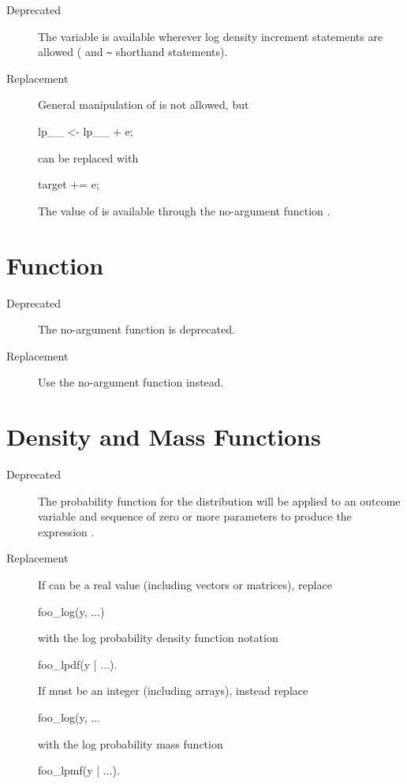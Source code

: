 \begin{description}
\item[Deprecated]
The variable  is available wherever log density increment
statements are allowed ( and \Verb|~| shorthand
statements).
\item[Replacement]
General manipulation of  is not allowed, but
\begin{stancode}
lp__ <- lp__ + e;
\end{stancode}
%
can be replaced with
%
\begin{stancode}
target += e;
\end{stancode}
%
The value of  is available through the no-argument
function .
\end{description}

\section{ Function}

\begin{description}
\item[Deprecated]
The no-argument function  is deprecated.
\item[Replacement]
Use the no-argument function  instead.
\end{description}

\section{ Density and Mass Functions}

\begin{description}
\item[Deprecated] The probability function for the distribution
   will be applied to an outcome variable  and
  sequence of zero or more parameters  to produce the
  expression .
\item[Replacement] If  can be a real value (including vectors
or matrices), replace
%
\begin{stancode}
foo_log(y, ...)
\end{stancode}
%
with the log probability density function notation
%
\begin{stancode}
foo_lpdf(y | ...).
\end{stancode}
%
If  must be an integer (including arrays),
instead replace
%
\begin{stancode}
foo_log(y, ...
\end{stancode}
%
with the log probability mass function
%
\begin{stancode}
foo_lpmf(y | ...).
\end{stancode}
\end{description}

